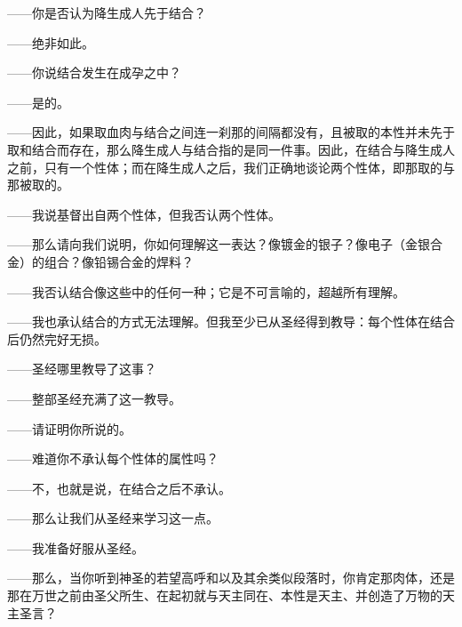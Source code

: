 ——你是否认为降生成人先于结合？\par

——绝非如此。\par

——你说结合发生在成孕之中？\par

——是的。\par

——因此，如果取血肉与结合之间连一刹那的间隔都没有，且被取的本性并未先于取和结合而存在，那么降生成人与结合指的是同一件事。因此，在结合与降生成人之前，只有一个性体；而在降生成人之后，我们正确地谈论两个性体，即那取的与那被取的。\par

——我说基督出自两个性体，但我否认两个性体。\par

——那么请向我们说明，你如何理解这一表达？像镀金的银子？像电子（金银合金）的组合？像铅锡合金的焊料？\par

——我否认结合像这些中的任何一种；它是不可言喻的，超越所有理解。\par

——我也承认结合的方式无法理解。但我至少已从圣经得到教导：每个性体在结合后仍然完好无损。\par

——圣经哪里教导了这事？\par

——整部圣经充满了这一教导。\par

——请证明你所说的。\par

——难道你不承认每个性体的属性吗？\par

——不，也就是说，在结合之后不承认。\par

——那么让我们从圣经来学习这一点。\par

——我准备好服从圣经。\par

——那么，当你听到神圣的若望高呼和以及其余类似段落时，你肯定那肉体，还是那在万世之前由圣父所生、在起初就与天主同在、本性是天主、并创造了万物的天主圣言？\par

